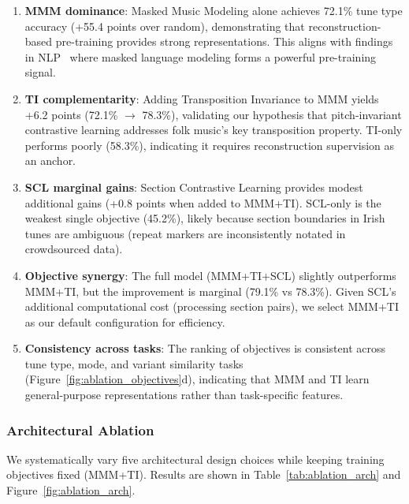 \documentclass[]{interact}
\theoremstyle{plain}
\theoremstyle{definition}
\theoremstyle{remark}
\begin{document}
\begin{enumerate}
\item \textbf{MMM dominance}: Masked Music Modeling alone achieves 72.1\% tune type accuracy (+55.4 points over random), demonstrating that reconstruction-based pre-training provides strong representations. This aligns with findings in NLP~\cite{BERT2019} where masked language modeling forms a powerful pre-training signal.

\item \textbf{TI complementarity}: Adding Transposition Invariance to MMM yields +6.2 points (72.1\% $\rightarrow$ 78.3\%), validating our hypothesis that pitch-invariant contrastive learning addresses folk music's key transposition property. TI-only performs poorly (58.3\%), indicating it requires reconstruction supervision as an anchor.

\item \textbf{SCL marginal gains}: Section Contrastive Learning provides modest additional gains (+0.8 points when added to MMM+TI). SCL-only is the weakest single objective (45.2\%), likely because section boundaries in Irish tunes are ambiguous (repeat markers are inconsistently notated in crowdsourced data).

\item \textbf{Objective synergy}: The full model (MMM+TI+SCL) slightly outperforms MMM+TI, but the improvement is marginal (79.1\% vs 78.3\%). Given SCL's additional computational cost (processing section pairs), we select MMM+TI as our default configuration for efficiency.

\item \textbf{Consistency across tasks}: The ranking of objectives is consistent across tune type, mode, and variant similarity tasks (Figure~\ref{fig:ablation_objectives}d), indicating that MMM and TI learn general-purpose representations rather than task-specific features.
\end{enumerate}

\subsubsection{Architectural Ablation}

We systematically vary five architectural design choices while keeping training objectives fixed (MMM+TI). Results are shown in Table~\ref{tab:ablation_arch} and Figure~\ref{fig:ablation_arch}.
\end{document}
